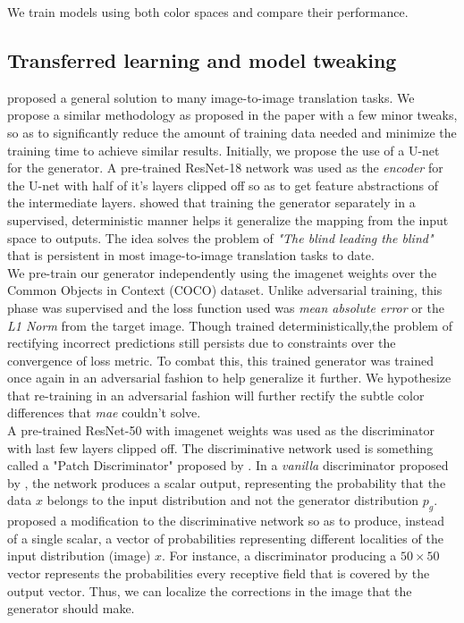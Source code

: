 \documentclass[conference]{IEEEtran}
\begin{document}
We train models using both color spaces and compare their performance.
\subsection{Transferred learning and model tweaking}
\hspace*{0.25 in}\cite{isola2018imagetoimage} proposed a general solution to many image-to-image translation tasks. We propose a similar methodology as proposed in the paper with a few minor tweaks, so as to significantly reduce the amount of training data needed and minimize the training time to achieve similar results. Initially, we propose the use of a U-net for the generator. A pre-trained ResNet-18 network was used as the \textit{encoder} for the U-net with half of it's layers clipped off so as to get feature abstractions of the intermediate layers. \cite{ledig2017photorealistic} showed that training the generator separately in a supervised, deterministic manner helps it generalize the mapping from the input space to outputs. The idea solves the problem of \textit{"The blind leading the blind"} that is persistent in most image-to-image translation tasks to date. \\
\hspace*{0.25 in}We pre-train our generator independently using the imagenet weights over the Common Objects in Context (COCO) dataset. Unlike adversarial training, this phase was supervised and the loss function used was \textit{mean absolute error} or the \textit{L1 Norm} from the target image. Though trained deterministically,the problem of rectifying incorrect predictions still persists due to constraints over the convergence of loss metric. To combat this, this trained generator was trained once again in an adversarial fashion to help generalize it further. We hypothesize that re-training in an adversarial fashion will further rectify the subtle color differences that \textit{mae} couldn't solve.\\
\hspace*{0.25 in}A pre-trained ResNet-50 with imagenet weights was used as the discriminator with last few layers clipped off. The discriminative network used is something called a "Patch Discriminator" proposed by \cite{isola2018imagetoimage}. In a \textit{vanilla} discriminator proposed by \cite{goodfellow2014generative}, the network produces a scalar output, representing the probability that the data $x$ belongs to the input distribution and not the generator distribution $p_g$. \cite{isola2018imagetoimage} proposed a modification to the discriminative network so as to produce, instead of a single scalar, a vector of probabilities representing different localities of the input distribution (image) $x$. For instance, a discriminator producing a $50 \times 50$ vector represents the probabilities every receptive field that is covered by the output vector. Thus, we can localize the corrections in the image that the generator should make.\\
\end{document}

